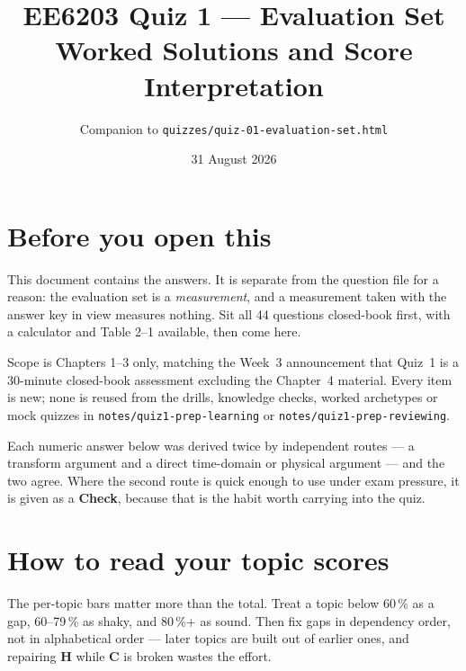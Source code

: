 \documentclass[10pt]{article}
\title{EE6203 Quiz 1 --- Evaluation Set\\\large Worked Solutions and Score Interpretation}
\author{Companion to \texttt{quizzes/quiz-01-evaluation-set.html}}
\date{31 August 2026}
\begin{document}
\maketitle

\section*{Before you open this}

This document contains the answers. It is separate from the question file for a
reason: the evaluation set is a \emph{measurement}, and a measurement taken with
the answer key in view measures nothing. Sit all 44 questions closed-book first,
with a calculator and Table 2--1 available, then come here.

Scope is Chapters 1--3 only, matching the Week~3 announcement that Quiz~1 is a
30-minute closed-book assessment excluding the Chapter~4 material. Every item is
new; none is reused from the drills, knowledge checks, worked archetypes or mock
quizzes in \texttt{notes/quiz1-prep-learning} or \texttt{notes/quiz1-prep-reviewing}.

Each numeric answer below was derived twice by independent routes --- a transform
argument and a direct time-domain or physical argument --- and the two agree. Where
the second route is quick enough to use under exam pressure, it is given as a
\textbf{Check}, because that is the habit worth carrying into the quiz.

\section*{How to read your topic scores}

The per-topic bars matter more than the total. Treat a topic below 60\,\% as a gap,
60--79\,\% as shaky, and 80\,\%+ as sound. Then fix gaps in dependency order, not in
alphabetical order --- later topics are built out of earlier ones, and repairing
\textbf{H} while \textbf{C} is broken wastes the effort.
\end{document}
